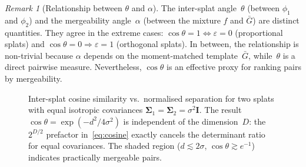 \documentclass[11pt, a4paper]{article}
\theoremstyle{plain}
\theoremstyle{definition}
\theoremstyle{remark}
\newtheorem{remark}[theorem]{Remark}
\newcommand{\Sig}{\bm{\Sigma}}
\begin{document}
\begin{remark}[Relationship between $\theta$ and $\alpha$]
The inter-splat angle~$\theta$ (between $\phi_1$ and $\phi_2$) and
the mergeability angle~$\alpha$ (between the mixture $f$ and
$\bar{G}$) are distinct quantities.  They agree in the extreme cases:
$\cos\theta = 1 \Leftrightarrow \varepsilon = 0$ (proportional
splats) and $\cos\theta = 0 \Rightarrow \varepsilon = 1$ (orthogonal
splats).  In between, the relationship is non-trivial because $\alpha$
depends on the moment-matched template~$\bar{G}$, while~$\theta$ is a
direct pairwise measure.  Nevertheless, $\cos\theta$ is an effective
proxy for ranking pairs by mergeability.
\end{remark}

\begin{figure}[ht]
\centering
{}
\caption{Inter-splat cosine similarity vs.\ normalised separation
  for two splats with equal isotropic covariances
  $\Sig_1 = \Sig_2 = \sigma^2\bm{I}$.  The result
  $\cos\theta = \exp(-d^2/4\sigma^2)$ is independent of the
  dimension~$D$: the $2^{D/2}$ prefactor in~\eqref{eq:cosine}
  exactly cancels the determinant ratio for equal covariances.
  The shaded region ($d \lesssim 2\sigma$, $\cos\theta \gtrsim e^{-1}$)
  indicates practically mergeable pairs.}
\label{fig:cosine_vs_distance}
\end{figure}
\end{document}
